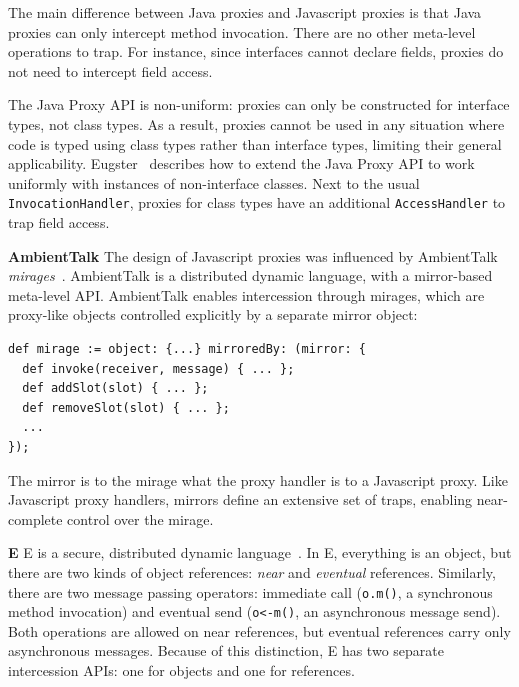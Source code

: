 \documentclass{sig-alternate}
\begin{document}
The main difference between Java proxies and Javascript proxies is that Java proxies can only intercept method invocation. There are no other meta-level operations to trap. For instance, since interfaces cannot declare fields, proxies do not need to intercept field access.

The Java Proxy API is non-uniform: proxies can only be constructed for interface types, not class types. As a result, proxies cannot be used in any situation where code is typed using class types rather than interface types, limiting their general applicability. Eugster~\cite{eugster06uniform} describes how to extend the Java Proxy API to work uniformly with instances of non-interface classes. Next to the usual \texttt{InvocationHandler}, proxies for class types have an additional \texttt{AccessHandler} to trap field access.


\textbf{AmbientTalk} The design of Javascript proxies was influenced by AmbientTalk \emph{mirages}~\cite{mostinckx07behavioral,mostinckx09mirrors}. AmbientTalk is a distributed dynamic language, with a mirror-based meta-level API. AmbientTalk enables intercession through mirages, which are proxy-like objects controlled explicitly by a separate mirror object:

\begin{lstlisting}[]
def mirage := object: {...} mirroredBy: (mirror: {
  def invoke(receiver, message) { ... };
  def addSlot(slot) { ... };
  def removeSlot(slot) { ... };
  ...
});
\end{lstlisting}

The mirror is to the mirage what the proxy handler is to a Javascript proxy. Like Javascript proxy handlers, mirrors define an extensive set of traps, enabling near-complete control over the mirage.

\textbf{E} E is a secure, distributed dynamic language~\cite{miller05concurrency}. In E, everything is an object, but there are two kinds of object references: \emph{near} and \emph{eventual} references. Similarly, there are two message passing operators: immediate call (\texttt{o.m()}, a synchronous method invocation) and eventual send (\texttt{o<-m()}, an asynchronous message send). Both operations are allowed on near references, but eventual references carry only asynchronous messages. Because of this distinction, E has two separate intercession APIs: one for objects and one for references.
\end{document}
